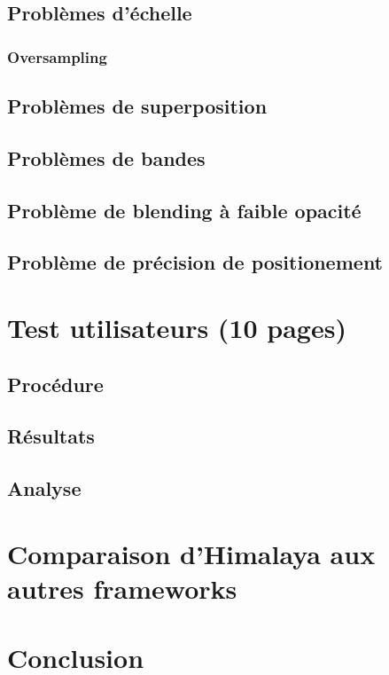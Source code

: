 	\section{Problèmes d'échelle}
		\subsection{Oversampling}
	\section{Problèmes de superposition}
	\section{Problèmes de bandes}
	\section{Problème de blending à faible opacité}
	\section{Problème de précision de positionement}
\chapter{Test utilisateurs (10 pages) }
	\section{Procédure}
	\section{Résultats}
	\section{Analyse}
\chapter{Comparaison d'Himalaya aux autres frameworks}
\chapter{Conclusion}

